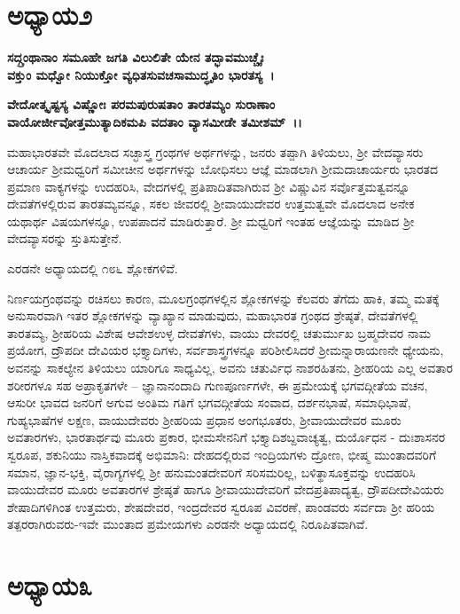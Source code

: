 \section*{ಅಧ್ಯಾಯ\enginline{-}೨}

\textbf{ಸದ್ಗ್ರಂಥಾನಾಂ ಸಮೂಹೇ ಜಗತಿ ವಿಲುಲಿತೇ ಯೇನ ತದ್ಭಾವಮುಚ್ಚೈಃ\\ ವಕ್ತುಂ ಮಧ್ವೋ ನಿಯುಕ್ತೋ ವ್ಯಧಿತಸುವಚಸಾಮುದ್ಧೃತಿಂ ಭಾರತಸ್ಯ~।}

\noindent
\textbf{ವೇದೋತ್ಕೃಷ್ಟಸ್ಯ ವಿಷ್ಣೋಃ ಪರಮಪುರುಷತಾಂ ತಾರತಮ್ಯಂ ಸುರಾಣಾಂ\\ ವಾಯೋರ್ಜೀವೋ\-ತ್ತಮುತ್ಯಾದಿಕಮಪಿ ವದತಾಂ ವ್ಯಾಸಮೀಡೇ ತಮೀಶಮ್~।। }

ಮಹಾಭಾರತವೇ ಮೊದಲಾದ ಸಚ್ಛಾಸ್ತ್ರ ಗ್ರಂಥಗಳ ಅರ್ಥಗಳನ್ನು, ಜನರು ತಪ್ಪಾಗಿ ತಿಳಿಯಲು, ಶ‍್ರೀ ವೇದವ್ಯಾಸರು ಆಚಾರ್ಯ ಶ‍್ರೀಮಧ್ವರಿಗೆ ಸಮೀಚೀನ ಅರ್ಥಗಳನ್ನು ಬೋಧಿಸಲು ಆಜ್ಞೆ ಮಾಡಲಾಗಿ ಶ‍್ರೀಮದಾಚಾರ್ಯರು ಭಾರತದ ಪ್ರಮಾಣ ವಾಕ್ಯಗಳನ್ನು ಉದಹರಿಸಿ, ವೇದಗಳಲ್ಲಿ ಪ್ರತಿಪಾದಿತವಾಗಿರುವ ಶ‍್ರೀ ವಿಷ್ಣುವಿನ ಸರ್ವೊತ್ತಮತ್ವವನ್ನೂ ದೇವತೆಗಳಲ್ಲಿರುವ ತಾರತಮ್ಯವನ್ನೂ, ಸಕಲ ಜೀವರಲ್ಲಿ ಶ‍್ರೀವಾಯುದೇವರ ಉತ್ತಮತ್ವವೇ ಮೊದಲಾದ ಅನೇಕ ಯಥಾರ್ಥ ವಿಷಯಗಳನ್ನೂ, ಉಪಪಾದನೆ ಮಾಡಿರುತ್ತಾರೆ. ಶ‍್ರೀ ಮಧ್ವರಿಗೆ ಇಂತಹ ಆಜ್ಞೆಯನ್ನು ಮಾಡಿದ ಶ‍್ರೀ ವೇದವ್ಯಾಸರನ್ನು ಸ್ತುತಿಸುತ್ತೇನೆ.

ಎರಡನೇ ಅಧ್ಯಾಯದಲ್ಲಿ ೧೮೬ ಶ್ಲೋಕಗಳಿವೆ.

ನಿರ್ಣಯಗ್ರಂಥವನ್ನು ರಚಿಸಲು ಕಾರಣ, ಮೂಲಗ್ರಂಥಗಳಲ್ಲಿನ ಶ್ಲೋಕಗಳನ್ನು ಕೆಲವರು ತೆಗೆದು ಹಾಕಿ, ತಮ್ಮ ಮತಕ್ಕೆ ಅನುಸಾರವಾಗಿ ಇತರ ಶ್ಲೋಕಗಳನ್ನು ವ್ಯಾಖ್ಯಾನ ಮಾಡುವುದು, ಮಹಾಭಾರತ ಗ್ರಂಥದ ಶ್ರೇಷ್ಠತೆ, ದೇವತೆಗಳಲ್ಲಿ ತಾರತಮ್ಯ, ಶ‍್ರೀಹರಿಯ ವಿಶೇಷ ಆವೇಶಉಳ್ಳ ದೇವತೆಗಳು, ವಾಯು ದೇವರಲ್ಲಿ ಚತುರ್ಮುಖ ಬ್ರಹ್ಮದೇವರ ನಾಮ ಪ್ರಯೋಗ, ದ್ರೌಪದೀ ದೇವಿಯರ ಭಕ್ತ್ಯಾದಿಗಳು, ಸರ್ವಶಾಸ್ತ್ರಗಳನ್ನೂ ಪರಿಶೀಲಿಸಿದರೆ ಶ‍್ರೀಮನ್ನಾರಾಯಣನೇ ಧ್ಯೇಯನು, ಅವನನ್ನು ಸಾಕಲ್ಯೇನ ತಿಳಿಯಲು ಯಾರಿಗೂ ಸಾಧ್ಯವಿಲ್ಲ, ಅವನು ಚತುರ್ವಿಧ ನಾಶರಹಿತನು, ಶ‍್ರೀಹರಿಯ ಎಲ್ಲ ಅವತಾರ ಶರೀರಗಳೂ ಸಹ ಅಪ್ರಾಕೃತಗಳೇ – ಜ್ಞಾನಾನಂದಾದಿ ಗುಣಪೂರ್ಣಗಳೇ, ಈ ಪ್ರಮೇಯಕ್ಕೆ ಭಗವದ್ಗೀತೆಯ ವಚನ, ಆಸುರೀ ಭಾವದ ಜನರಿಗೆ ಅಗುವ ಅಂತಿಮ ಗತಿಗೆ ಭಗವದ್ಗೀತೆಯ ಸಂವಾದ, ದರ್ಶನಭಾಷೆ, ಸಮಾಧಿಭಾಷೆ, ಗುಹ್ಯಭಾಷೆಗಳ ಲಕ್ಷಣ, ವಾಯುದೇವರು ಶ‍್ರೀಹರಿಯ ಪ್ರಧಾನ ಅಂಗಭೂತರು, ಶ‍್ರೀವಾಯುದೇವರ ಮೂರು ಅವತಾರಗಳು, ಭಾರತಾರ್ಥವು ಮೂರು ಪ್ರಕಾರ, ಭೀಮಸೇನನಿಗೆ ಭಕ್ತ್ಯಾದಿಶಬ್ದವಾಚ್ಯತ್ವ, ದುರ್ಯೊಧನ - ದುಃಶಾಸನರ ಸ್ವರೂಪ, ಶಕುನಿಯು ನಾಸ್ತಿಕವಾದಕ್ಕೆ ಅಭಿಮಾನಿ: ದೇಹದಲ್ಲಿರುವ ಇಂದ್ರಿಯಗಳು ದ್ರೋಣ, ಭೀಷ್ಮ ಮುಂತಾದವರಿಗೆ ಸಮಾನ, ಜ್ಞಾನ-ಭಕ್ತಿ, ವೈರಾಗ್ಯಗಳಲ್ಲಿ ಶ‍್ರೀ ಹನುಮಂತದೇವರಿಗೆ ಸರಿಸಮರಿಲ್ಲ, ಬಳಿತ್ಥಾಸೂಕ್ತವನ್ನು ಉದಹರಿಸಿ ವಾಯುದೇವರ ಮೂರು ಅವತಾರಗಳ ಶ್ರೇಷ್ಠತೆ ಹಾಗೂ ಶ‍್ರೀವಾಯುದೇವರಿಗೆ ವೇದಪ್ರತಿಪಾದ್ಯತ್ವ, ದ್ರೌಪದೀದೇವಿಯರು ಶೇಷಾದಿಗಳಿಗಿಂತ ಉತ್ತಮರು, ಶೇಷದೇವರ, ಇಂದ್ರದೇವರ ಸ್ವರೂಪ ವಿವರಣೆ, ಪಾಂಡವರು ಸರ್ವದಾ ಶ‍್ರೀ ಹರಿಯ ತತ್ಪರರಾಗಿರುವರು-ಇವೇ ಮುಂತಾದ ಪ್ರಮೇಯಗಳು ಎರಡನೇ ಅಧ್ಯಾಯದಲ್ಲಿ ನಿರೂಪಿತವಾಗಿವೆ.


\section*{ಅಧ್ಯಾಯ\enginline{-}೩}


